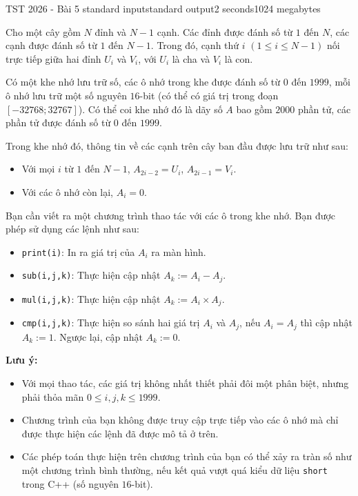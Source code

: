 \begin{problem}{TST 2026 - Bài 5 }{standard input}{standard output}{2 seconds}{1024 megabytes}

Cho một cây gồm $N$ đỉnh và $N-1$ cạnh. Các đỉnh được đánh số từ $1$ đến $N$, các cạnh được đánh số từ $1$ đến $N-1$. Trong đó, cạnh thứ $i$ $(1 \le i \le N-1)$ nối trực tiếp giữa hai đỉnh $U_i$ và $V_i$, với $U_i$ là cha và $V_i$ là con.

Có một khe nhớ lưu trữ số, các ô nhớ trong khe được đánh số từ $0$ đến $1999$, mỗi ô nhớ lưu trữ một số nguyên $16$-bit (có thể có giá trị trong đoạn $[-32768;32767]$). Có thể coi khe nhớ đó là dãy số $A$ bao gồm $2000$ phần tử, các phần tử được đánh số từ $0$ đến $1999$.

Trong khe nhớ đó, thông tin về các cạnh trên cây ban đầu được lưu trữ như sau:
\begin{itemize}
    \item Với mọi $i$ từ $1$ đến $N-1$, $A_{2i-2} = U_i$, $A_{2i-1} = V_i$.
    \item Với các ô nhớ còn lại, $A_i = 0$.
\end{itemize}

Bạn cần viết ra một chương trình thao tác với các ô trong khe nhớ. Bạn được phép sử dụng các lệnh như sau:
\begin{itemize}
    \item \texttt{print(i)}: In ra giá trị của $A_i$ ra màn hình.
    \item \texttt{sub(i,j,k)}: Thực hiện cập nhật $A_k := A_i - A_j$.
    \item \texttt{mul(i,j,k)}: Thực hiện cập nhật $A_k := A_i \times A_j$.
    \item \texttt{cmp(i,j,k)}: Thực hiện so sánh hai giá trị $A_i$ và $A_j$, nếu $A_i = A_j$ thì cập nhật $A_k := 1$. Ngược lại, cập nhật $A_k := 0$.
\end{itemize}

\textbf{Lưu ý:}
\begin{itemize}
    \item Với mọi thao tác, các giá trị không nhất thiết phải đôi một phân biệt, nhưng phải thỏa mãn $0 \le i,j,k \le 1999$.
    \item Chương trình của bạn không được truy cập trực tiếp vào các ô nhớ mà chỉ được thực hiện các lệnh đã được mô tả ở trên.
    \item Các phép toán thực hiện trên chương trình của bạn có thể xảy ra tràn số như một chương trình bình thường, nếu kết quả vượt quá kiểu dữ liệu \texttt{short} trong C++ (số nguyên $16$-bit).
\end{itemize}


\end{problem}
